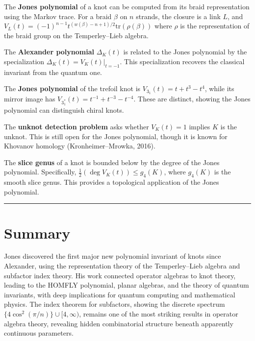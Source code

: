 The \textbf{Jones polynomial} of a knot can be computed from its braid representation using the Markov trace. For a braid $\beta$ on $n$ strands, the closure is a link $L$, and $V_L(t) = (-1)^{n-1} t^{(w(\beta)-n+1)/2} \text{tr}(\rho(\beta))$ where $\rho$ is the representation of the braid group on the Temperley--Lieb algebra.

The \textbf{Alexander polynomial} $\Delta_K(t)$ is related to the Jones polynomial by the specialization $\Delta_K(t) = V_K(t)|_{t = -1}$. This specialization recovers the classical invariant from the quantum one.

The \textbf{Jones polynomial} of the trefoil knot is $V_{3_1}(t) = t + t^3 - t^4$, while its mirror image has $V_{3_1^*}(t) = t^{-1} + t^{-3} - t^{-4}$. These are distinct, showing the Jones polynomial can distinguish chiral knots.

The \textbf{unknot detection problem} asks whether $V_K(t) = 1$ implies $K$ is the unknot. This is still open for the Jones polynomial, though it is known for Khovanov homology (Kronheimer--Mrowka, 2016).

The \textbf{slice genus} of a knot is bounded below by the degree of the Jones polynomial. Specifically, $\frac{1}{2}(\deg V_K(t)) \leq g_4(K)$, where $g_4(K)$ is the smooth slice genus. This provides a topological application of the Jones polynomial.

\begin{center}\rule{0.5\linewidth}{0.5pt}\end{center}

\section*{Summary}

Jones discovered the first major new polynomial invariant of knots since Alexander, using the representation theory of the Temperley--Lieb algebra and subfactor index theory. His work connected operator algebras to knot theory, leading to the HOMFLY polynomial, planar algebras, and the theory of quantum invariants, with deep implications for quantum computing and mathematical physics. The index theorem for subfactors, showing the discrete spectrum $\{4\cos^2(\pi/n)\} \cup [4, \infty)$, remains one of the most striking results in operator algebra theory, revealing hidden combinatorial structure beneath apparently continuous parameters.
